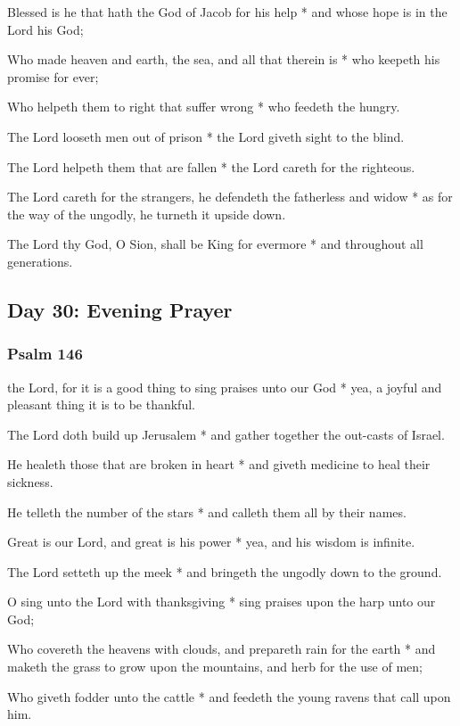 Blessed is he that hath the God of Jacob for his help * and whose hope is in the Lord his God;

Who made heaven and earth, the sea, and all that therein is * who keepeth his promise for ever;

Who helpeth them to right that suffer wrong * who feedeth the hungry.

The Lord looseth men out of prison * the Lord giveth sight to the blind.

The Lord helpeth them that are fallen * the Lord careth for the righteous.

The Lord careth for the strangers, he defendeth the fatherless and widow * as for the way of the ungodly, he turneth it upside down.

The Lord thy God, O Sion, shall be King for evermore * and throughout all generations.

\subsection{Day 30: Evening Prayer}

\subsubsection{Psalm 146}


 the Lord, for it is a good thing to sing praises unto our God * yea, a joyful and pleasant thing it is to be thankful.

The Lord doth build up Jerusalem * and gather together the out-casts of Israel.

He healeth those that are broken in heart * and giveth medicine to heal their sickness.

He telleth the number of the stars * and calleth them all by their names.

Great is our Lord, and great is his power * yea, and his wisdom is infinite.

The Lord setteth up the meek * and bringeth the ungodly down to the ground.

O sing unto the Lord with thanksgiving * sing praises upon the harp unto our God;

Who covereth the heavens with clouds, and prepareth rain for the earth * and maketh the grass to grow upon the mountains, and herb for the use of men;

Who giveth fodder unto the cattle * and feedeth the young ravens that call upon him.

